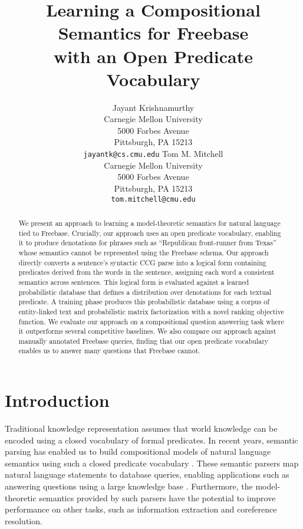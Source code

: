 \documentclass[11pt]{article}
\title{Learning a Compositional Semantics for Freebase \\ with an Open
  Predicate Vocabulary}
\author{Jayant Krishnamurthy\\
        Carnegie Mellon University\\
        5000 Forbes Avenue\\
        Pittsburgh, PA 15213\\
	{\tt jayantk@cs.cmu.edu}
	  \And
	Tom M. Mitchell\\
        Carnegie Mellon University\\
        5000 Forbes Avenue\\
        Pittsburgh, PA 15213\\
        {\tt tom.mitchell@cmu.edu}}
\date{}
\begin{document}
\maketitle
\begin{abstract}
We present an approach to learning a model-theoretic semantics for
natural language tied to Freebase. Crucially, our approach uses an
open predicate vocabulary, enabling it to produce denotations for
phrases such as ``Republican front-runner from Texas'' whose semantics
cannot be represented using the Freebase schema. Our approach directly
converts a sentence's syntactic CCG parse into a logical form
containing predicates derived from the words in the sentence,
assigning each word a consistent semantics across sentences. This
logical form is evaluated against a learned probabilistic database
that defines a distribution over denotations for each textual
predicate. A training phase produces this probabilistic database using
a corpus of entity-linked text and probabilistic matrix factorization
with a novel ranking objective function. We evaluate our approach on a
compositional question answering task where it outperforms several
competitive baselines. We also compare our approach against manually
annotated Freebase queries, finding that our open predicate vocabulary
enables us to answer many questions that Freebase cannot.

\end{abstract}

\section{Introduction}

Traditional knowledge representation assumes that world knowledge can
be encoded using a closed vocabulary of formal predicates. In recent
years, semantic parsing has enabled us to build compositional models
of natural language semantics using such a closed predicate vocabulary
\cite{zelle1996,zettlemoyer05}. These semantic parsers map natural
language statements to database queries, enabling applications such as
answering questions using a large knowledge base
\cite{yahya12,krishnamurthy2012,cai2013acl,kwiatkowski2013,berant2013,berant2014,reddy2014}. Furthermore,
the model-theoretic semantics provided by such parsers have the
potential to improve performance on other tasks, such as information
extraction and coreference resolution.
\end{document}
